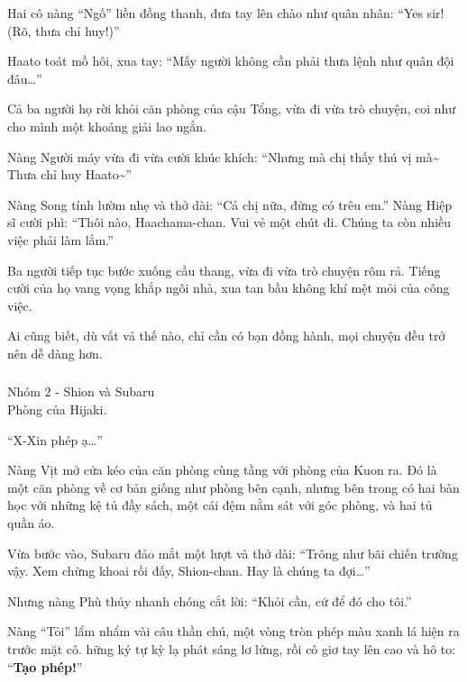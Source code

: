 \documentclass[../main.tex]{subfiles}
\begin{document}
Hai cô nàng ``Ngố'' liền đồng thanh, đưa tay lên chào như quân nhân: ``Yes sir! (Rõ, thưa chỉ huy!)''

Haato toát mồ hôi, xua tay: ``Mấy người không cần phải thưa lệnh như quân đội đâu\dots''

Cả ba người họ rời khỏi căn phòng của cậu Tổng, vừa đi vừa trò chuyện, coi như cho mình một khoảng giải lao ngắn.

Nàng Người máy vừa đi vừa cười khúc khích: ``Nhưng mà chị thấy thú vị mà\~{} Thưa chỉ huy Haato\~{}''

Nàng Song tính lườm nhẹ và thở dài: ``Cả chị nữa, đừng có trêu em.'' Nàng Hiệp sĩ cười phì: ``Thôi nào, Haachama-chan. Vui vẻ một chút đi. Chúng ta còn nhiều việc phải làm lắm.''

Ba người tiếp tục bước xuống cầu thang, vừa đi vừa trò chuyện rôm rả. Tiếng cười của họ vang vọng khắp ngôi nhà, xua tan bầu không khí mệt mỏi của công việc.

Ai cũng biết, dù vất vả thế nào, chỉ cần có bạn đồng hành, mọi chuyện đều trở nên dễ dàng hơn.

\vspace{-40pt} \subsubsection*{\label{ep-003.IVb}} 

\begin{center}
    {\color{T2} Nhóm 2 - Shion và Subaru}\\Phòng của Hijaki.
\end{center}

``X-Xin phép ạ\dots''

Nàng Vịt mở cửa kéo của căn phòng cùng tầng với phòng của Kuon ra. Đó là một căn phòng về cơ bản giống như phòng bên cạnh, nhưng bên trong có hai bàn học với những kệ tủ đầy sách, một cái đệm nằm sát với góc phòng, và hai tủ quần áo.

Vừa bước vào, Subaru đảo mắt một lượt và thở dài: ``Trông như bãi chiến trường vậy. Xem chừng khoai rồi đấy, Shion-chan. Hay là chúng ta đợi\dots''

Nhưng nàng Phù thủy nhanh chóng cắt lời: ``Khỏi cần, cứ để đó cho tôi.''

Nàng ``Tỏi'' lẩm nhẩm vài câu thần chú, một vòng tròn phép màu xanh lá hiện ra trước mặt cô. hững ký tự kỳ lạ phát sáng lơ lửng, rồi cô giơ tay lên cao và hô to: ``\textbf{Tạo phép!}''
\end{document}
